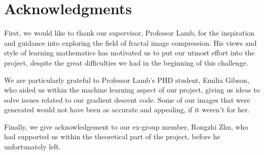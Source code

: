 \documentclass[a4paper,11pt, titlepage]{article}
\theoremstyle{definition}
\theoremstyle{plain}
\theoremstyle{remark}
\theoremstyle{definition}
\begin{document}
\newpage
\section*{Acknowledgments}

First, we would like to thank our supervisor, Professor Lamb, for the inspiration and guidance into exploring the field of fractal image compression. His views and style of learning mathematics has motivated us to put our utmost effort into the project, despite the great difficulties we had in the beginning of this challenge.

We are particularly grateful to Professor Lamb's PHD student, Emilia Gibson, who aided us within the machine learning aspect of our project, giving us ideas to solve issues related to our gradient descent code. Some of our images that were generated would not have been as accurate and appealing, if it weren't for her.

Finally, we give acknowledgement to our ex-group member, Rongzhi Zhu, who had supported us within the theoretical part of the project, before he unfortunately left.


\nocite{*}


\end{document}
